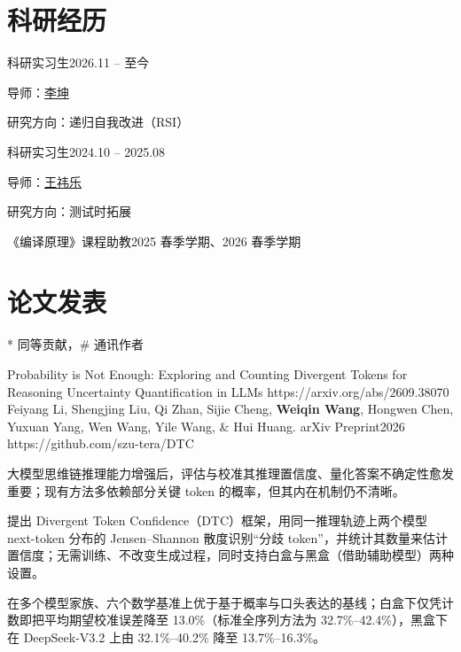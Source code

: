 \section{科研经历}

  {科研实习生}{2026.11 -- 至今}
\begin{cvitems}
  \item 导师：\href{https://drugd.github.io/KunLiCV.github.io/}{李坤}
  \item 研究方向：递归自我改进（RSI）
\end{cvitems}

  {科研实习生}{2024.10 -- 2025.08}
\begin{cvitems}
  \item 导师：\href{https://ylwangy.github.io/}{王祎乐}
  \item 研究方向：测试时拓展
\end{cvitems}

  {《编译原理》课程助教}{2025 春季学期、2026 春季学期}


\section{论文发表}
{\footnotesize\color{muted}* 同等贡献，\# 通讯作者\par}
\vspace{-0.6ex}

\pub
  {Probability is Not Enough: Exploring and Counting Divergent Tokens for Reasoning Uncertainty Quantification in LLMs}
  {https://arxiv.org/abs/2609.38070}
  {Feiyang Li, Shengjing Liu, Qi Zhan, Sijie Cheng, \textbf{Weiqin Wang}, Hongwen Chen, Yuxuan Yang, Wen Wang, Yile Wang, \& Hui Huang.}
  {arXiv Preprint}{2026}
  {https://github.com/szu-tera/DTC}
\begin{pubnotes}
  \item {}大模型思维链推理能力增强后，评估与校准其推理置信度、量化答案不确定性愈发重要；现有方法多依赖部分关键 token 的概率，但其内在机制仍不清晰。
  \item {}提出 Divergent Token Confidence（DTC）框架，用同一推理轨迹上两个模型 next-token 分布的 Jensen--Shannon 散度识别“分歧 token”，并统计其数量来估计置信度；无需训练、不改变生成过程，同时支持白盒与黑盒（借助辅助模型）两种设置。
  \item {}在多个模型家族、六个数学基准上优于基于概率与口头表达的基线；白盒下仅凭计数即把平均期望校准误差降至 13.0\%（标准全序列方法为 32.7\%--42.4\%），黑盒下在 DeepSeek-V3.2 上由 32.1\%--40.2\% 降至 13.7\%--16.3\%。
\end{pubnotes}


